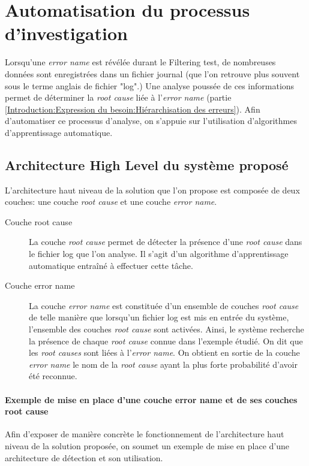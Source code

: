 \chapter{Automatisation du processus d'investigation}
\label{Automatisation du processus d'investigation}
\thispagestyle{fancy}
Lorsqu'une \emph{error name} est révélée durant le Filtering test, de nombreuses données sont enregistrées dans un fichier journal (que l'on retrouve plus souvent sous le terme anglais de fichier "log".) Une analyse poussée de ces informations permet de déterminer la \emph{root cause} liée à l'\emph{error name} (partie \ref{Introduction:Expression du besoin:Hiérarchisation des erreurs}). Afin d'automatiser ce processus d'analyse, on s'appuie sur l'utilisation d'algorithmes d'apprentissage automatique. 

\section{Architecture High Level du système proposé}
\label{Automatisation du processus d'investigation: Achitecture High Level du système proposé}
L'architecture haut niveau de la solution que l'on propose est composée de deux couches: une couche \emph{root cause} et une couche \emph{error name}.
\begin{description}
	\item [Couche root cause] La couche \emph{root cause} permet de détecter la présence d'une \emph{root cause} dans le fichier log que l'on analyse. Il s'agit d'un algorithme d'apprentissage automatique entraîné à effectuer cette tâche.
	\item [Couche error name] La couche \emph{error name} est constituée d'un ensemble de couches \emph{root cause} de telle manière que lorsqu'un fichier log est mis en entrée du système, l'ensemble des couches \emph{root cause} sont activées. Ainsi, le système recherche la présence de chaque \emph{root cause} connue dans l'exemple étudié. On dit que les \emph{root causes} sont liées à l'\emph{error name}. On obtient en sortie de la couche \emph{error name} le nom de la \emph{root cause} ayant la plus forte probabilité d'avoir été reconnue.
\end{description} 

\subsubsection{Exemple de mise en place  d'une couche error name et de ses couches root cause}
\label{Automatisation du processus d'investigation: Achitecture High Level du système proposé: Exemple de mise en place  d'une couche error name et de ses couches root cause}
Afin d'exposer de manière concrète le fonctionnement de l'architecture haut niveau de la solution proposée, on soumet un exemple de mise en place d'une architecture de détection et son utilisation. \\

